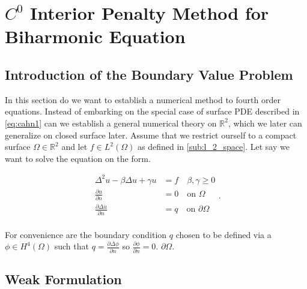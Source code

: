 \newpage
\section{$C^0$ Interior Penalty Method for Biharmonic Equation}
\label{sec:ch1}

\subsection{Introduction of the Boundary Value Problem}%
\label{sub:introduction_of_the_bvp}


In this section do we want to establish a numerical method to fourth order equations. Instead of embarking on the
special case of surface PDE described in \eqref{eq:cahn1} can we establish a general numerical theory on $\mathbb{R} ^2$, which we later can generalize on closed surface later. Assume that we restrict ourself to a compact surface $\Omega \in \mathbb{R} ^2 $ and let $f \in L^{2}\left( \Omega
\right) $ as defined in \ref{sub:l_2_space}.
Let say we want to solve the equation on the form.

\begin{equation}
\label{eq:ch1_bvp}
\begin{split}
    \Delta ^2 u - \beta \Delta u + \gamma u &= f \quad \beta , \gamma \ge 0 \\
    \frac{\partial u}{\partial  n}  &= 0 \quad \text{on }\Omega  \\
    \frac{\partial \Delta u}{\partial  n}  &= q \quad \text{on } \partial \Omega  \\
\end{split}
.\end{equation}

For convenience are the boundary condition $q$ chosen to be defined via a  $\phi \in H^{4}\left( \Omega  \right)$
such that $q = \frac{\partial \Delta \phi }{\partial  n} $ so $\frac{\partial \phi }{\partial  n}  = 0$.
$\partial \Omega $.


\subsection{Weak Formulation}%
\label{sub:weak_formulation}

